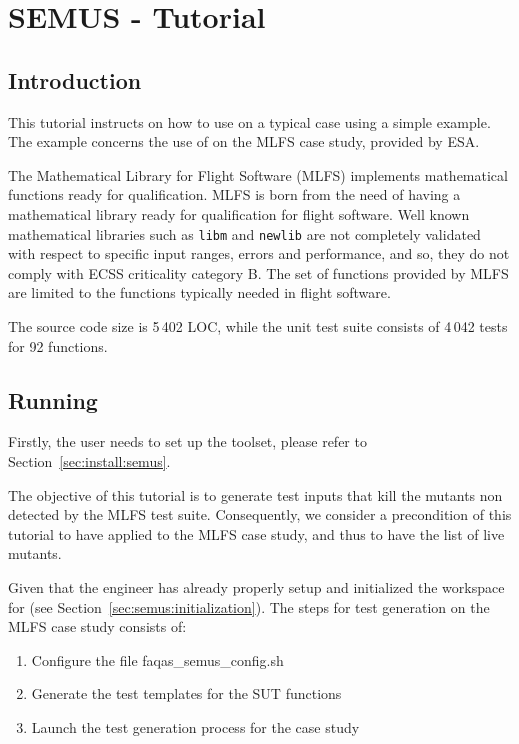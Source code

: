 
\chapter{SEMUS - Tutorial}
\label{chapter:semus:tutorial}

\section{Introduction}

This tutorial instructs on how to use \SEMUS on a typical case using a simple example. The example concerns the use of \SEMUS on the MLFS case study, provided by ESA.

The Mathematical Library for Flight Software (MLFS) implements mathematical functions ready for qualification. 
MLFS is born from the need of having a mathematical library ready for qualification for flight software. Well known mathematical libraries such as \texttt{libm} and \texttt{newlib} are not completely validated with respect to specific input ranges, errors and performance, and so, they do not comply with ECSS criticality category B.
The set of functions provided by MLFS are limited to the functions typically needed in flight software. 

The source code size is 5\,402 LOC, while the unit test suite consists of 4\,042 tests for 92 functions.

\section{Running \SEMUS}
\label{sec:semus_running}

Firstly, the user needs to set up the \SEMUS toolset, please refer to Section~\ref{sec:install:semus}.

The objective of this tutorial is to generate test inputs that kill the mutants non detected by the MLFS test suite. Consequently, we consider a precondition of this tutorial to have applied \MASS to the MLFS case study, and thus to have the list of live mutants.

Given that the engineer has already properly setup and initialized the workspace for \SEMUS (see Section~\ref{sec:semus:initialization}). The steps for test generation on the MLFS case study consists of:

\begin{enumerate}
    \item Configure the file faqas\_semus\_config.sh
    \item Generate the test templates for the SUT functions
    \item Launch the test generation process for the case study
\end{enumerate}


